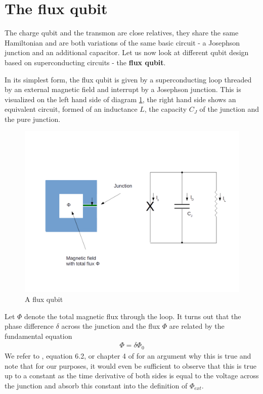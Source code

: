 \documentclass[a4paper, draft]{article}
\theoremstyle{own}
\theoremstyle{remark}
\begin{document}
\section{The flux qubit}

The charge qubit and the transmon are close relatives, they share the same Hamiltonian and are both variations of the same basic circuit - a Josephson junction and an additional capacitor. Let us now look at different qubit design based on superconducting circuits - the {\bf flux qubit}.

In its simplest form, the flux qubit is given by a superconducting loop threaded by an external magnetic field and interrupt by a Josephson junction. This is visualized on the left hand side of diagram \ref{fig:FluxQubit}, the right hand side shows an equivalent circuit, formed of an inductance $L$, the capacity $C_J$ of the junction and the pure junction.

\begin{figure}[ht]
\centering
\includegraphics[width=0.7\linewidth]{images/FluxQubit}
\caption[A flux qubit]{A flux qubit}
\label{fig:FluxQubit}
\end{figure}


Let $\Phi$ denote the total magnetic flux through the loop. It turns out that the phase difference $\delta$ across the junction and the flux $\Phi$ are related by the fundamental equation
\begin{align}
\label{eq:fluxphase}
\Phi = \delta \Phi_0
\end{align}
We refer to \cite{Likharev}, equation 6.2, or chapter 4 of \cite{GrossMarxLectureNotes} for an argument why this is true and note that for our purposes, it would even be sufficient to observe that this is true up to a constant as the time derivative of both sides is equal to the voltage across the junction and absorb this constant into the definition of $\Phi_{ext}$. 
\end{document}
